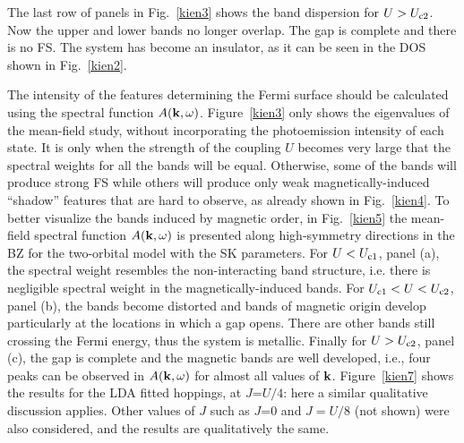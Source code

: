 \documentclass[aps,prb,superscriptaddress,preprintnumbers,
showpacs,legalpaper,twoside,twocolumn,amsmath,amssymb]{revtex4}
\begin{document}




The last row of panels in Fig.~\ref{kien3} shows the band dispersion for $U>U_{\rm c2}$. Now the upper and lower bands no longer
overlap. The gap is complete and there is no FS.
The system has become an insulator, as it can be seen in the DOS shown in
Fig.~\ref{kien2}.

The intensity of the features determining the Fermi surface
should be calculated using the spectral function
$A({\bf k},\omega)$. Figure~\ref{kien3} only shows the eigenvalues of the mean-field
study, without incorporating the photoemission intensity of each state.
It is only when the strength of the coupling $U$ becomes very large  that the spectral weights for all the bands will be
equal. Otherwise, some of the bands will produce strong FS while others will produce only
weak magnetically-induced ``shadow'' features that are hard to observe, as already shown
in Fig.~\ref{kien4}. To better visualize the bands induced
by magnetic order, in Fig.~\ref{kien5} the mean-field
spectral function $A({\bf k},\omega)$ is presented along
high-symmetry directions in the BZ for the two-orbital model with the SK parameters.\cite{daghofer} For $U<U_{\rm c1}$, panel (a), the spectral weight
resembles the non-interacting band structure, i.e. there is negligible
spectral weight in the magnetically-induced bands. For $U_{\rm c1}<U<U_{\rm c2}$,
panel (b),
the bands become distorted and bands of magnetic origin develop particularly at the
locations in which a gap opens. There are other
bands still crossing the Fermi energy, thus
the system is metallic.
Finally for $U>U_{\rm c2}$,
panel (c), the gap is
complete and the magnetic bands are well developed, i.e., four peaks can
be observed in $A({\bf k},\omega)$ for almost all values of ${\bf k}$.
Figure~\ref{kien7}
shows the results for the LDA fitted hoppings,\cite{scalapino}
at $J$=$U/4$: here a similar qualitative discussion applies.
%
Other values of $J$ such as $J$=$0$ and $J=U/8$
(not shown) were also considered, and the results are qualitatively the same.
\end{document}
